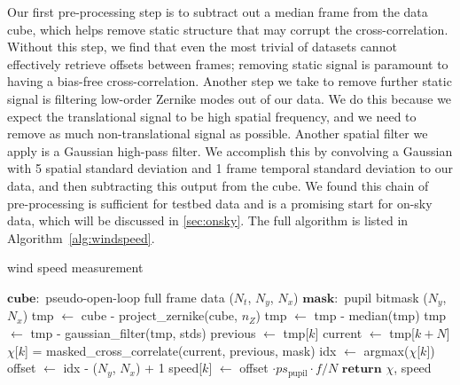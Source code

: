 Our first pre-processing step is to subtract out a median frame from the data cube, which helps remove static structure that may corrupt the cross-correlation. Without this step, we find that even the most trivial of datasets cannot effectively retrieve offsets between frames; removing static signal is paramount to having a bias-free cross-correlation. Another step we take to remove further static signal is filtering low-order Zernike modes out of our data. We do this because we expect the translational signal to be high spatial frequency, and we need to remove as much non-translational signal as possible. Another spatial filter we apply is a Gaussian high-pass filter. We accomplish this by convolving a Gaussian with \SI{5}{\pixel} spatial standard deviation and 1 frame temporal standard deviation to our data, and then subtracting this output from the cube. We found this chain of pre-processing is sufficient for testbed data and is a promising start for on-sky data, which will be discussed in \autoref{sec:onsky}. The full algorithm is listed in Algorithm~\autoref{alg:windspeed}.

\begin{algorithm}
\caption{wind speed measurement}\label{alg:windspeed}
\begin{algorithmic}[0]
\State $\mathbf{cube:}$ pseudo-open-loop full frame data ($N_t$, $N_y$, $N_x$)
\State $\mathbf{mask:}$ pupil bitmask ($N_y$, $N_x$)
    \State tmp $\gets$ cube - project\_zernike(cube, $n_Z$) 
    \State tmp $\gets$ tmp - median(tmp) 
    \State tmp $\gets$ tmp - gaussian\_filter(tmp, stds) 
     
        \State previous $\gets$ tmp[$k$]
        \State current $\gets$ tmp[$k+N$]
        \State $\chi$[$k$] = masked\_cross\_correlate(current, previous, mask)
        \State idx $\gets$ argmax($\chi$[$k$])
        \State offset $\gets$ idx - ($N_y$, $N_x$) + 1 
        \State speed[$k$] $\gets$ offset $\cdot ps_\mathrm{pupil} \cdot f / N$
    \EndFor
    \State $\mathbf{return}$ $\chi$, speed
\EndProcedure
\end{algorithmic}
\end{algorithm}

